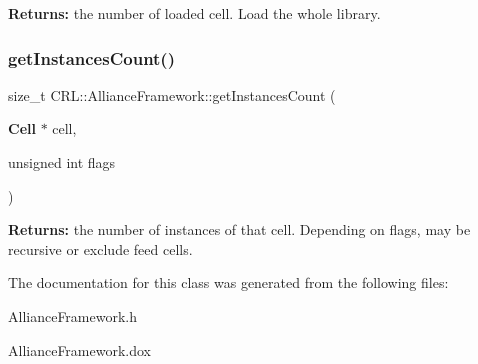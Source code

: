{\bfseries Returns\+:} the number of loaded cell. Load the whole library. \mbox{\label{classCRL_1_1AllianceFramework_a95aa8c6b8ab3f995daf22a0317324933}} 
\subsubsection{\texorpdfstring{get\+Instances\+Count()}{getInstancesCount()}}
{\footnotesize\ttfamily size\+\_\+t C\+R\+L\+::\+Alliance\+Framework\+::get\+Instances\+Count (\begin{DoxyParamCaption}\item[{\textbf{ Cell} $\ast$}]{cell,  }\item[{unsigned int}]{flags }\end{DoxyParamCaption})\hspace{0.3cm}{\ttfamily [static]}}

{\bfseries Returns\+:} the number of instances of that cell. Depending on {\ttfamily flags}, may be recursive or exclude feed cells. 

The documentation for this class was generated from the following files\+:\begin{DoxyCompactItemize}
\item 
Alliance\+Framework.\+h\item 
Alliance\+Framework.\+dox\end{DoxyCompactItemize}
